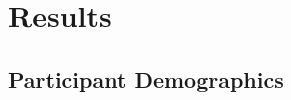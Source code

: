 \section{Results}
\label{sec:UserStudyResults}

\subsection{Participant Demographics}
\label{subsec:UserStudyDemographics}

\endinput


TODOs

1. Have I used SLOC (source lines of code) before? Do I need to define a new
   acronym?
2. Is the counting software I use (cloc) okay?
3. Is # files + SLOC a decent proxy for complexity?


